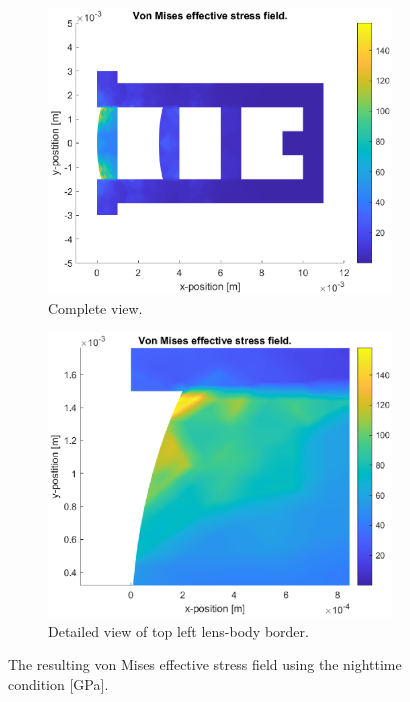 \documentclass[a4paper,11pt]{article}
\begin{document}
\begin{figure}[H]
    \centering
    \begin{subfigure}{0.45\linewidth}{
        \centering
        \includegraphics[width=1\linewidth]{cNight.eps}
        \caption{Complete view.}
        \label{sub:cnight}
    }\end{subfigure}
    \begin{subfigure}{0.45\linewidth}{
        \centering
        \includegraphics[width=1\linewidth]{cNightDetail.eps}
        \caption{Detailed view of top left lens-body border.}
        \label{sub:cnight_detail}
    }\end{subfigure}
    \caption{The resulting von Mises effective stress field using the nighttime condition [GPa].}
    \label{fig:cnight}
\end{figure}
\end{document}
